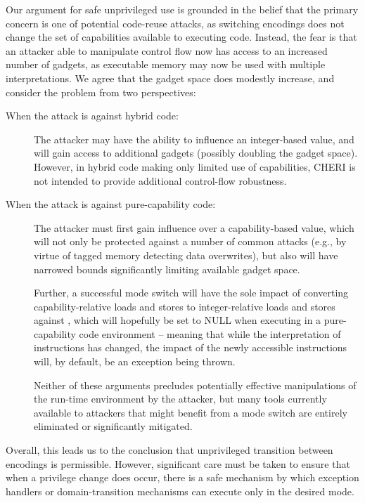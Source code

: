 Our argument for safe unprivileged use is grounded in the belief that the
primary concern is one of potential code-reuse attacks, as switching encodings
does not change the set of capabilities available to executing code.
Instead, the fear is that an attacker able to manipulate control flow now has
access to an increased number of gadgets, as executable memory may now be used
with multiple interpretations.
We agree that the gadget space does modestly increase, and consider the
problem from two perspectives:

\begin{description}
\item[When the attack is against hybrid code:] The attacker may have the
  ability to influence an integer-based \PC{} value, and will gain access to
  additional gadgets (possibly doubling the gadget space).
  However, in hybrid code making only limited use of capabilities, CHERI is
  not intended to provide additional control-flow robustness.

\item[When the attack is against pure-capability code:] The attacker must
  first gain influence over a capability-based \PCC{} value, which will not
  only be protected against a number of common attacks (e.g., by virtue of
  tagged memory detecting data overwrites), but also will have narrowed
  bounds significantly limiting available gadget space.

  Further, a successful mode switch will have the sole impact of converting
  capability-relative loads and stores to integer-relative loads and stores
  against \DDC{}, which will hopefully be set to NULL when executing in a
  pure-capability code environment -- meaning that while the interpretation of
  instructions has changed, the impact of the newly accessible instructions
  will, by default, be an exception being thrown.

  Neither of these arguments precludes potentially effective manipulations of
  the run-time environment by the attacker, but many tools currently available
  to attackers that might benefit from a mode switch are entirely eliminated
  or significantly mitigated.
\end{description}

Overall, this leads us to the conclusion that unprivileged transition between
encodings is permissible.
However, significant care must be taken to ensure that when a privilege change
does occur, there is a safe mechanism by which exception handlers or
domain-transition mechanisms can execute only in the desired mode.

